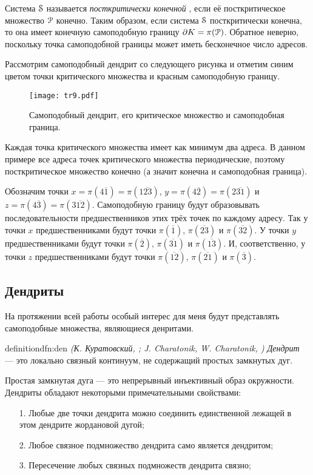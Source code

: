 Система ${\EuScript S}$ называется {\em посткритически конечной} \cite{Kig}, если её посткритическое множество ${\EuScript P}$ конечно. 
Таким образом, если система ${\EuScript S}$ посткритически конечна, то она имеет конечную самоподобную границу $\partial K=\pi({\EuScript P})$.
Обратное неверно, поскольку точка самоподобной границы может иметь бесконечное число адресов.

\begin{example}
Рассмотрим самоподобный дендрит со следующего рисунка и отметим синим цветом точки критического множества и красным самоподобную границу.
\begin{figure}[h!]
\centering
\texttt{[image: tr9.pdf]}
\caption{Самоподобный дендрит, его критическое множество и самоподобная граница.}
\end{figure}
Каждая точка критического множества имеет как минимум два адреса.
В данном примере все адреса точек критического множества периодические, поэтому посткритическое множество конечно (а значит конечна и самоподобная граница).

Обозначим точки $x=\pi(4\overline{1})=\pi(1\overline{23})$, $y=\pi(4\overline{2})=\pi(2\overline{31})$ и $z=\pi(4\overline{3})=\pi(3\overline{12})$.
Самоподобную границу будут образовывать последовательности предшественников этих трёх точек по каждому адресу.
Так у точки $x$ предшественниками будут точки $\pi(\overline{1})$, $\pi(\overline{23})$ и $\pi(\overline{32}).$
У точки $y$ предшественниками будут точки $\pi(\overline{2})$, $\pi(\overline{31})$ и $\pi(\overline{13}).$
И, соответственно, у точки $z$ предшественниками будут точки $\pi(\overline{12})$, $\pi(\overline{21})$ и $\pi(\overline{3})$.
\end{example}


\subsection{Дендриты}

На протяжении всей работы особый интерес для меня будут представлять самоподобные множества, являющиеся денритами. 

\begin{restatethis}{definition}{dfn:den} %
{\em (К. Куратовский, \cite{Kur1}; J. Charatonik, W. Charatonik, \cite{Char1998})}
{\em Дендрит} --- это локально связный континуум, не содержащий простых замкнутых дуг.     
\end{restatethis}

Простая замкнутая дуга --- это непрерывный инъективный образ окружности.
Дендриты обладают некоторыми примечательными свойствами:
\begin{enumerate}[nolistsep]
\item[1.] Любые две точки дендрита можно соединить единственной лежащей в этом дендрите жордановой дугой;
\item[2.] Любое связное подмножество дендрита само является дендритом;
\item[3.] Пересечение любых связных подмножеств дендрита связно;
\end{enumerate}

